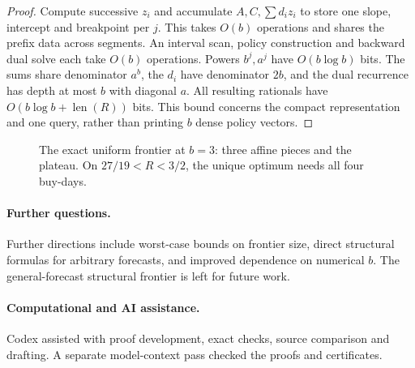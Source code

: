 \documentclass[manuscript,11pt,screen,nonacm]{acmart}
\begin{document}
\begin{proof}
Compute successive $z_i$ and accumulate $A,C,\sum d_iz_i$ to store one
slope, intercept and breakpoint per $j$. This takes $O(b)$ operations
and shares the prefix data across segments. An interval scan, policy
construction and backward dual solve each take $O(b)$ operations.
Powers $b^j,a^j$ have $O(b\log b)$ bits. The sums share denominator
$a^b$, the $d_i$ have denominator $2b$, and the dual recurrence has depth
at most $b$ with diagonal $a$. All resulting rationals have
$O(b\log b+\operatorname{len}(R))$ bits. This bound concerns the compact
representation and one query, rather than printing $b$ dense policy vectors.
\end{proof}

\begin{figure}[ht]
\centering
{}
\caption{The exact uniform frontier at $b=3$: three affine pieces and the
plateau. On $27/19<R<3/2$, the unique optimum needs all four buy-days.}
\label{fig:frontier}
\end{figure}

\paragraph{Further questions.}
Further directions include worst-case bounds on frontier size, direct
structural formulas for arbitrary forecasts, and improved dependence on
numerical $b$. The general-forecast structural frontier is left for future work.

\paragraph{Computational and AI assistance.}
Codex assisted with proof development, exact checks, source comparison and
drafting. A separate model-context pass checked the proofs and certificates.



\clearpage\onehalfspacing
\end{document}
